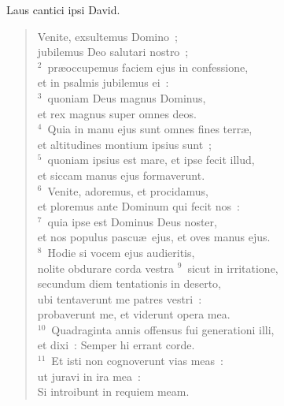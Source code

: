 \bchapter
\lettrine[lines=3,image=true,loversize=0.05,lraise=-0.03]{L}{}aus cantici ipsi David. \begin{flushleft}\begin{verse}\vspace{6pt}Venite, exsultemus Domino~;\\ jubilemus Deo salutari nostro~;\\
${}^{2}$~pr\ae occupemus faciem ejus in confessione,\\ et in psalmis jubilemus ei~:\\
${}^{3}$~quoniam Deus magnus Dominus,\\ et rex magnus super omnes deos.\\
${}^{4}$~Quia in manu ejus sunt omnes fines terr\ae ,\\ et altitudines montium ipsius sunt~;\\
${}^{5}$~quoniam ipsius est mare, et ipse fecit illud,\\ et siccam manus ejus formaverunt.\\
${}^{6}$~Venite, adoremus, et procidamus,\\ et ploremus ante Dominum qui fecit nos~:\\
${}^{7}$~quia ipse est Dominus Deus noster,\\ et nos populus pascu\ae\ ejus, et oves manus ejus.\\
${}^{8}$~Hodie si vocem ejus audieritis,\\ nolite obdurare corda vestra
${}^{9}$~sicut in irritatione,\\ secundum diem tentationis in deserto,\\ ubi tentaverunt me patres vestri~:\\ probaverunt me, et viderunt opera mea.\\
${}^{10}$~Quadraginta annis offensus fui generationi illi,\\ et dixi~: Semper hi errant corde.\\
${}^{11}$~Et isti non cognoverunt vias meas~:\\ ut juravi in ira mea~:\\ Si introibunt in requiem meam.\end{verse}\end{flushleft}



